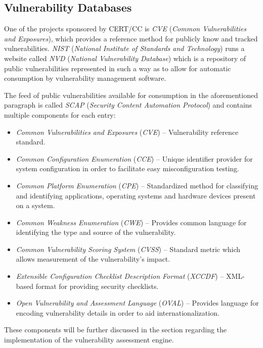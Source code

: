 \documentclass[a4paper,12pt]{article}
\begin{document}
\subsection{Vulnerability Databases}
	
	One of the projects sponsored by CERT/CC is \textit{CVE} (\textit{Common Vulnerabilities and Exposures}), which provides a reference method for publicly know and tracked vulnerabilities. \textit{NIST} (\textit{National Institute of Standards and Technology}) runs a website called \textit{NVD} (\textit{National Vulnerability Database}) which is a repository of public vulnerabilities represented in such a way as to allow for automatic consumption by vulnerability management software\cite{nvd15}.
	
	The feed of public vulnerabilities available for consumption in the aforementioned paragraph is called \textit{SCAP} (\textit{Security Content Automation Protocol}) and contains multiple components for each entry:
	
	\begin{itemize}
		\item \textit{Common Vulnerabilities and Exposures} (\textit{CVE}) -- Vulnerability reference standard.
		\item \textit{Common Configuration Enumeration} (\textit{CCE}) -- Unique identifier provider for system configuration in order to facilitate easy misconfiguration testing.
		\item \textit{Common Platform Enumeration} (\textit{CPE}) -- Standardized method for classifying and identifying applications, operating systems and hardware devices present on a system.
		\item \textit{Common Weakness Enumeration} (\textit{CWE}) -- Provides common language for identifying the type and source of the vulnerability.
		\item \textit{Common Vulnerability Scoring System} (\textit{CVSS}) -- Standard metric which allows measurement of the vulnerability's impact.
		\item \textit{Extensible Configuration Checklist Description Format} (\textit{XCCDF}) -- XML-based format for providing security checklists.
		\item \textit{Open Vulnerability and Assessment Language} (\textit{OVAL}) -- Provides language for encoding vulnerability details in order to aid internationalization.
	\end{itemize}
	
	These components will be further discussed in the section regarding the implementation of the vulnerability assessment engine.
	
\end{document}
